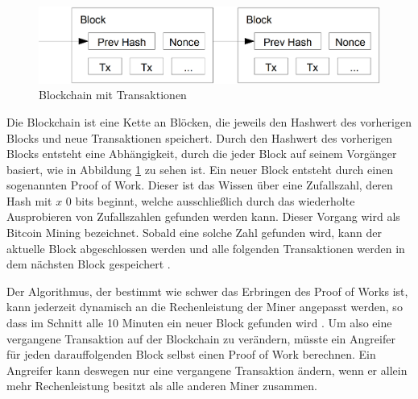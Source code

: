 \documentclass[
	fontsize=11pt,
	headings=small,
	parskip=half,           %
	bibliography=totoc,
	numbers=noenddot,       %
	open=any,               %
]{scrreprt}
\begin{document}
\begin{figure}[h]
    \centering
    \caption{Blockchain mit Transaktionen \cite{btc-nakamoto2008bitcoin}}
    \label{fig:btc_blockchain}
    \includegraphics[width=0.5\linewidth]{BitcoinBlockchain.png}
\end{figure}

Die Blockchain ist eine Kette an Blöcken, die jeweils den Hashwert des vorherigen Blocks und neue Transaktionen speichert. Durch den Hashwert des vorherigen Blocks entsteht eine Abhängigkeit, durch die jeder Block auf seinem Vorgänger basiert, wie in Abbildung \ref{fig:btc_blockchain} zu sehen ist. Ein neuer Block entsteht durch einen sogenannten Proof of Work. Dieser ist das Wissen über eine Zufallszahl, deren Hash mit $x$ 0 bits beginnt, welche ausschließlich durch das wiederholte Ausprobieren von Zufallszahlen gefunden werden kann. Dieser Vorgang wird als Bitcoin Mining bezeichnet. Sobald eine solche Zahl gefunden wird, kann der aktuelle Block abgeschlossen werden und alle folgenden Transaktionen werden in dem nächsten Block gespeichert \cite{btc-nakamoto2008bitcoin}.

Der Algorithmus, der bestimmt wie schwer das Erbringen des Proof of Works ist, kann jederzeit dynamisch an die Rechenleistung der Miner angepasst werden, so dass im Schnitt alle 10 Minuten ein neuer Block gefunden wird \cite{btc-Zaghloul2019Bitcoin}. Um also eine vergangene Transaktion auf der Blockchain zu verändern, müsste ein Angreifer für jeden darauffolgenden Block selbst einen Proof of Work berechnen. Ein Angreifer kann deswegen nur eine vergangene Transaktion ändern, wenn er allein mehr Rechenleistung besitzt als alle anderen Miner zusammen.
\end{document}

